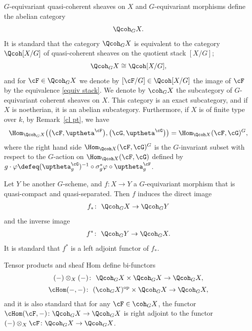 $G$-equivariant quasi-coherent sheaves on $X$ and $G$-equivariant morphisms define the abelian category
\begin{gather*}
\Qcoh_GX.
\end{gather*}
It is standard that the category $\Qcoh_GX$ is equivalent to the category $\Qcoh [X/G]$ of quasi-coherent sheaves on the quotient stack $[X/G]$;
\begin{equation}\label{equiv stack}
\Qcoh_GX\cong \Qcoh [X/G],
\end{equation}
 and for $\cF\in \Qcoh_GX$ we denote by $[\cF/G]\in \Qcoh [X/G]$ the image of $\cF$ by the equivalence \eqref{equiv stack}. We denote by $\coh_GX$ the subcategory of $G$-equivariant coherent sheaves on $X$. This category is an exact subcategory, and if $X$ is noetherian, it is an abelian subcategory. Furthermore, if $X$ is of finite type over $k$, by Remark~\ref{cl pt}, we have
\begin{equation}\label{G hom}
\Hom_{\Qcoh_GX}\big(\big(\cF,\uptheta^{\cF}\big),\big(\cG,\uptheta^{\cG}\big)\big) =\Hom_{\Qcoh X}(\cF,\cG)^G,
\end{equation}
where the right hand side $\Hom_{\Qcoh X}(\cF,\cG)^G$ is the $G$-invariant subset with respect to the $G$-action on $\Hom_{\Qcoh X}(\cF,\cG)$ defined by
$g\cdot\varphi\defeq (\uptheta^{\cG}_g)^{-1}\circ\sigma_g^*\varphi\circ\uptheta^{\cF}_g$.

Let $Y$ be another $G$-scheme, and $f\colon X\to Y$ a $G$-equivariant morphism that is quasi-compact and quasi-separated. Then $f$ induces the direct image\vspace{-.5ex}
\begin{gather*}
f_*\colon\ \Qcoh_G X\to \Qcoh_G Y
\end{gather*}
and the inverse image\vspace{-.5ex}
\begin{gather*}
f^*\colon\ \Qcoh_G Y\to \Qcoh_GX.
\end{gather*}
It is standard that $f^*$ is a left adjoint functor of $f_*$.

Tensor products and sheaf Hom define bi-functors
\begin{gather*}
(-)\otimes_{X}(-)\colon\ \Qcoh_G X\times \Qcoh_G X\to \Qcoh_G X,
\\[.5ex]
\cHom(-,-)\colon\ (\coh_G X)^{\rm op}\times \Qcoh_G X\to \Qcoh_G X,
\end{gather*}
and it is also standard that for any $\cF\in \coh_GX$, the functor $\cHom(\cF,-)\colon\Qcoh_G X\to \Qcoh_G X$ is right adjoint to the functor $(-)\otimes_{X}\cF\colon\Qcoh_G X\to \Qcoh_G X$.

